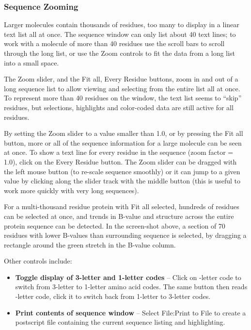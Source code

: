 \subsubsection {Sequence Zooming }
	Larger molecules contain thousands of residues, too many to display in a linear text list all at once.
The sequence window can only list about 40 text lines;  to work with a molecule of more 
than 40 residues use the scroll bars to scroll through the long list, or use the {\sf Zoom} controls to fit the data from a long list into a small space.

	The {\sf Zoom} slider, and the {\sf Fit all}, {\sf Every Residue} buttons, zoom in and out of a long sequence list to allow viewing and selecting from the entire list all at once.  To represent more than 40 residues on the window, the text list  seems to ``skip'' residues, but selections, highlights and color-coded data are still active for all residues.  

By setting the {\sf Zoom} slider to a value smaller than 1.0, or by pressing the {\sf Fit all} button, more or all of the sequence information for a large molecule can be seen at once. To show a text line for every residue in the sequence (zoom factor = 1.0), click on the {\sf Every Residue} button.  The {\sf Zoom} slider can be dragged with the left mouse button (to re-scale sequence smoothly) or it can jump to a given value by clicking along the slider track with the middle button (this is useful to work more quickly with very long sequences). 

	
For a multi-thousand residue protein with {\sf Fit all} selected, hundreds of  residues 
can be selected at once, and   trends in B-value 
and structure across the entire protein sequence can be detected.
In the screen-shot above, a section of 70 residues with lower B-values than surrounding sequence is selected, by dragging a rectangle around the green stretch in the B-value column.


	Other controls include:

\begin {itemize} 
  \item {\bf Toggle display of  3-letter and 1-letter codes} -- Click on {-letter code} to switch from 3-letter to 1-letter amino acid codes. The same button then reads {-letter code}, click it to switch back from 1-letter to 3-letter codes.

\item {\bf Print contents of sequence window} -- 
	Select {\sf File:Print to File} to create a postscript file containing the current sequence listing and highlighting.

\end{itemize}

